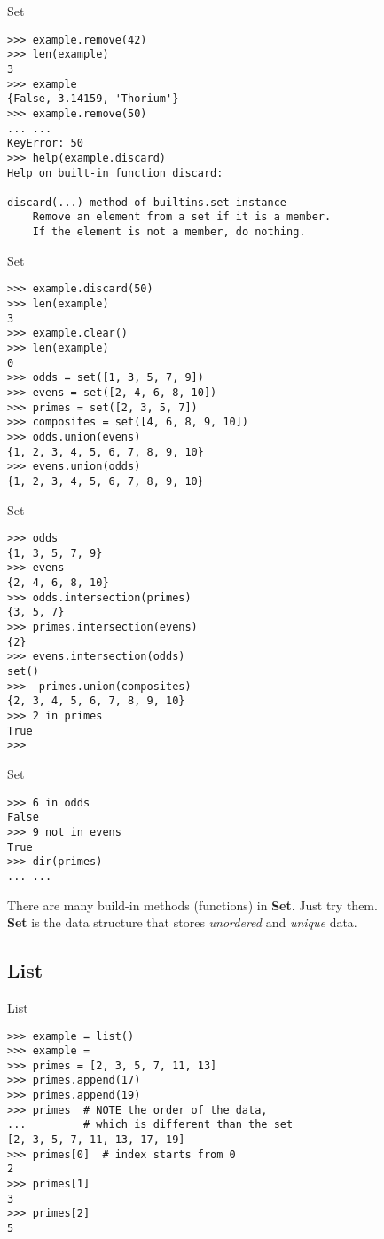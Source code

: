 \documentclass{beamer}
\begin{document}
\begin{frame}[fragile]{Set}
\begin{verbatim}
>>> example.remove(42)
>>> len(example)
3
>>> example
{False, 3.14159, 'Thorium'}
>>> example.remove(50)
... ...
KeyError: 50
>>> help(example.discard)
Help on built-in function discard:

discard(...) method of builtins.set instance
    Remove an element from a set if it is a member.
    If the element is not a member, do nothing.
\end{verbatim}
\end{frame}

\begin{frame}[fragile]{Set}
\begin{verbatim}
>>> example.discard(50)
>>> len(example)
3
>>> example.clear()
>>> len(example)
0
>>> odds = set([1, 3, 5, 7, 9])
>>> evens = set([2, 4, 6, 8, 10])
>>> primes = set([2, 3, 5, 7])
>>> composites = set([4, 6, 8, 9, 10])
>>> odds.union(evens)
{1, 2, 3, 4, 5, 6, 7, 8, 9, 10}
>>> evens.union(odds)
{1, 2, 3, 4, 5, 6, 7, 8, 9, 10}
\end{verbatim}
\end{frame}

\begin{frame}[fragile]{Set}
\begin{verbatim}
>>> odds
{1, 3, 5, 7, 9}
>>> evens
{2, 4, 6, 8, 10}
>>> odds.intersection(primes)
{3, 5, 7}
>>> primes.intersection(evens)
{2}
>>> evens.intersection(odds)
set()
>>>  primes.union(composites)
{2, 3, 4, 5, 6, 7, 8, 9, 10}
>>> 2 in primes
True
>>>
\end{verbatim}
\end{frame}

\begin{frame}[fragile]{Set}
\begin{verbatim}
>>> 6 in odds
False
>>> 9 not in evens
True
>>> dir(primes)
... ...
\end{verbatim}

There are many build-in methods (functions) in \textbf{Set}. Just try them.\\
\textbf{Set} is the data structure that stores \textit{unordered} and \textit{unique} data.
\end{frame}

\subsection{List}

\begin{frame}[fragile]{List}
\begin{verbatim}
>>> example = list()
>>> example = 
>>> primes = [2, 3, 5, 7, 11, 13]
>>> primes.append(17)
>>> primes.append(19)
>>> primes  # NOTE the order of the data, 
...         # which is different than the set
[2, 3, 5, 7, 11, 13, 17, 19]
>>> primes[0]  # index starts from 0
2
>>> primes[1]
3
>>> primes[2]
5
\end{verbatim}
\end{frame}
\end{document}
